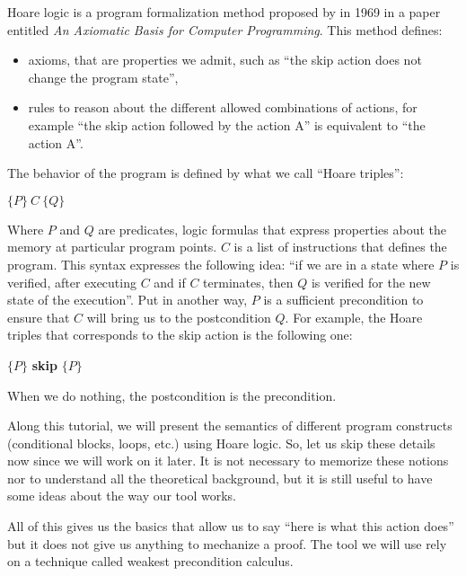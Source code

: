 Hoare logic is a program formalization method proposed by
in 1969 in a paper entitled \emph{An Axiomatic Basis for Computer
Programming}. This method defines:
\begin{itemize}
\item   axioms, that are properties we admit, such as ``the skip action does
  not change the program state'',
\item   rules to reason about the different allowed combinations of actions,
  for example ``the skip action followed by the action A'' is equivalent
  to ``the action A''.
\end{itemize}


The behavior of the program is defined by what we call ``Hoare
triples'':




\begin{center}
$\{P\}\ C\ \{Q\}$
\end{center}


Where $P$ and $Q$ are predicates, logic formulas that express
properties about the memory at particular program points. $C$ is a
list of instructions that defines the program. This syntax expresses the
following idea: ``if we are in a state where $P$ is verified, after
executing $C$ and if $C$ terminates, then $Q$ is verified for the
new state of the execution''. Put in another way, $P$ is a sufficient
precondition to ensure that $C$ will bring us to the postcondition
$Q$. For example, the Hoare triples that corresponds to the skip
action is the following one:




\begin{center}
$\{P\}$ \textbf{skip} $\{P\}$
\end{center}


When we do nothing, the postcondition is the precondition.



Along this tutorial, we will present the semantics of different program
constructs (conditional blocks, loops, etc.) using Hoare logic. So,
let us skip these details now since we will work on it later. It is
not necessary to memorize these notions nor to understand all the
theoretical background, but it is still useful to have some ideas about
the way our tool works.



All of this gives us the basics that allow us to say ``here is what
this action does'' but it does not give us anything to mechanize a
proof. The tool we will use rely on a technique called weakest
precondition calculus.



